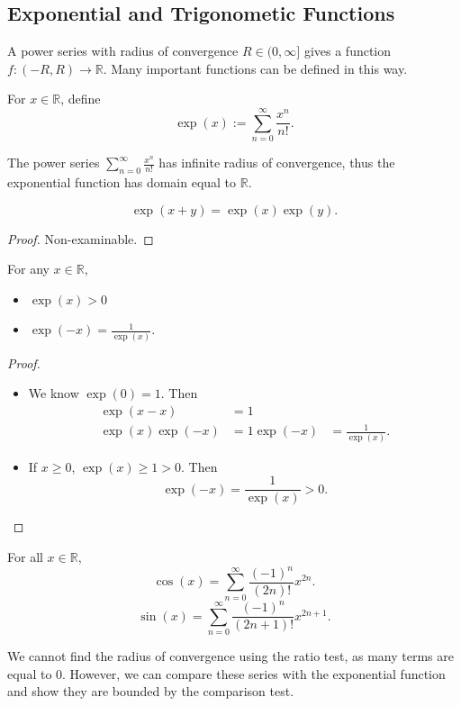 \subsection{Exponential and Trigonometic Functions}

A power series with radius of convergence $R \in (0, \infty]$ gives a function $f:(-R,R) \rightarrow \mathbb{R}$. Many important functions can be defined in this way.

\begin{definition}
    For $x \in \mathbb{R}$, define
    \[\exp(x) := \sum_{n=0}^{\infty} \frac{x^n}{n!}.\]
\end{definition}

\begin{prop}
    The power series $\sum_{n=0}^{\infty} \frac{x^n}{n!}$ has infinite radius of convergence, thus the exponential function has domain equal to $\mathbb{R}$.
\end{prop}

\begin{prop}
    \[\exp(x + y) = \exp(x)\exp(y).\]
\end{prop}
\begin{proof}
    Non-examinable.
\end{proof}

\begin{corollary}
    For any $x \in \mathbb{R}$,
    \begin{itemize}
        \item $\exp(x) > 0$
        \item $\exp( - x) = \frac{1}{\exp(x)}$.
    \end{itemize}
\end{corollary}
\begin{proof}
    \begin{itemize}
      \item We know $\exp(0) = 1$. Then
        \begin{align*}
          \exp(x - x) &= 1 \\
              \exp(x) \exp(-x) &= 1
              \exp(-x) &= \frac{1}{\exp(x)}
        .\end{align*}
    \item If $x \geq 0$, $\exp(x) \geq 1 > 0$. Then
      \[\exp(-x) = \frac{1}{\exp(x)} > 0.\]
    \end{itemize}
\end{proof}


\begin{definition}
    For all $x \in \mathbb{R}$,
    \[\cos(x) = \sum_{n=0}^{\infty} \frac{(-1)^n}{(2n)!} x ^ {2n}.\]
    \[\sin(x) =\sum_{n=0}^{\infty} \frac{(-1)^n}{(2n + 1)!} x ^{2n + 1}.\]
\end{definition}

\begin{remark}
    We cannot find the radius of convergence using the ratio test, as many terms are equal to $0$. However, we can compare these series with the exponential function and show they are bounded by the comparison test.
\end{remark}
